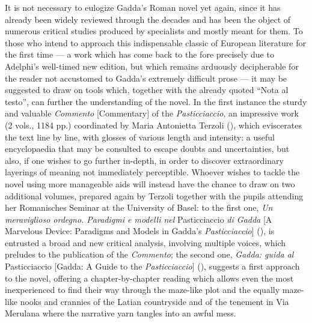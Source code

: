 \begin{review}
It is not necessary to eulogize Gadda's Roman
novel yet again, since it has already been widely reviewed through the decades and has been the object of numerous
critical studies produced by specialists and mostly meant for them. To
those who intend to approach this indispensable
classic of European literature for the first time --- a work which has come back to the fore
precisely due to Adelphi's well-timed new edition, but which
remains arduously decipherable for the reader not accustomed to Gadda's
extremely difficult prose --- it may be suggested to draw on tools which,
together with the already quoted ``Nota al testo'', can further the understanding of the novel. In the first instance the sturdy and valuable
\emph{Commento} {[}Commentary{]} of the \emph{Pasticciaccio}, an
impressive work (2 vols., 1184 pp.) coordinated by Maria Antonietta
Terzoli (\citeyear{terzoli_commento_2015}), which eviscerates the text line by line, with glosses of
various length and intensity: a useful encyclopaedia that may be
consulted to escape doubts and uncertainties, but also, if one
wishes to go further in-depth, in order to discover extraordinary
layerings of meaning not immediately perceptible. Whoever wishes to
tackle the novel using more manageable aids will instead have the chance
to draw on two additional volumes, prepared again by Terzoli together
with the pupils attending her Romanisches Seminar at the University of
Basel: to the first one, \emph{Un meraviglioso ordegno. Paradigmi e
modelli nel} Pasticciaccio \emph{di Gadda} {[}A Marvelous Device:
Paradigms and Models in Gadda's \emph{Pasticciaccio}{]} (\citeyear{terzoli_meraviglioso_2013}), is entrusted a
broad and new critical analysis, involving multiple voices, which
preludes to the publication of the \emph{Commento}; the second one,
\emph{Gadda: guida al} Pasticciaccio {[}Gadda: A Guide to the
\emph{Pasticciaccio}{]} (\citeyear{terzoli_gadda_2016}), suggests a first approach to the novel,
offering a chapter-by-chapter reading which allows even the most
inexperienced to find their way through the maze-like plot and the equally
maze-like nooks and crannies of the Latian countryside and of the
tenement in Via Merulana where the narrative yarn tangles into an awful mess.

\begin{flushleft}
  
\end{flushleft}

\end{review}